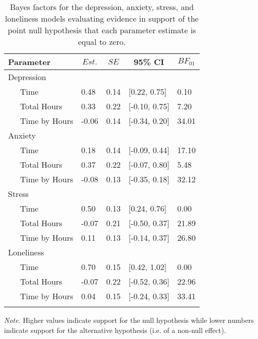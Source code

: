 \documentclass[
  english,
  jou,floatsintext]{apa6}
\begin{document}
\begin{table*}[tbp]

\begin{center}
\begin{threeparttable}

\caption{\label{tab:dass-bayes-pre-post}Bayes factors for the depression, anxiety, stress, and loneliness models evaluating evidence in support of the point null hypothesis that each parameter estimate is equal to zero.}

\begin{tabular}{lllll}
\toprule
Parameter & \multicolumn{1}{c}{$Est.$} & \multicolumn{1}{c}{$SE$} & \multicolumn{1}{c}{95\% CI} & \multicolumn{1}{c}{$BF_{01}$}\\
\midrule
Depression &  &  &  & \\
\ \ \ Time & 0.48 & 0.14 & [0.22, 0.75] & 0.10\\
\ \ \ Total Hours & 0.33 & 0.22 & [-0.10, 0.75] & 7.20\\
\ \ \ Time by Hours & -0.06 & 0.14 & [-0.34, 0.20] & 34.01\\
Anxiety &  &  &  & \\
\ \ \ Time & 0.18 & 0.14 & [-0.09, 0.44] & 17.10\\
\ \ \ Total Hours & 0.37 & 0.22 & [-0.07, 0.80] & 5.48\\
\ \ \ Time by Hours & -0.08 & 0.13 & [-0.35, 0.18] & 32.12\\
Stress &  &  &  & \\
\ \ \ Time & 0.50 & 0.13 & [0.24, 0.76] & 0.00\\
\ \ \ Total Hours & -0.07 & 0.21 & [-0.50, 0.37] & 21.89\\
\ \ \ Time by Hours & 0.11 & 0.13 & [-0.14, 0.37] & 26.80\\
Loneliness &  &  &  & \\
\ \ \ Time & 0.70 & 0.15 & [0.42, 1.02] & 0.00\\
\ \ \ Total Hours & -0.07 & 0.22 & [-0.52, 0.36] & 22.96\\
\ \ \ Time by Hours & 0.04 & 0.15 & [-0.24, 0.33] & 33.41\\
\bottomrule
\addlinespace
\end{tabular}

\begin{tablenotes}[para]
\normalsize{\textit{Note.} Higher values indicate support for the null hypothesis while lower numbers indicate support for the alternative hypothesis (i.e. of a non-null effect).}
\end{tablenotes}

\end{threeparttable}
\end{center}

\end{table*}
\end{document}
